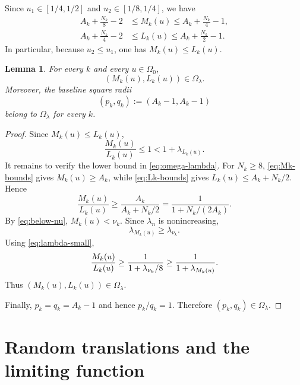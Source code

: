 \documentclass[11pt]{amsart}
\numberwithin{equation}{section}
\newtheorem{lemma}[theorem]{Lemma}
\begin{document}
Since $u_1\in[1/4,1/2]$ and $u_2\in[1/8,1/4]$, we have 
\begin{align}
A_k+\frac{N_k}{8}-2 &\le M_k(u)\le A_k+\frac{N_k}{4}-1,  \label{eq:Mk-bounds}
\\
A_k+\frac{N_k}{4}-2 &\le L_k(u)\le A_k+\frac{N_k}{2}-1.  \label{eq:Lk-bounds}
\end{align}
In particular, because $u_2\le u_1$, one has $M_k(u)\le L_k(u)$.

\begin{lemma}
\label{lem:inside-region} For every $k$ and every $u\in\Omega_0$, 
\begin{equation*}
(M_k(u),L_k(u))\in\Omega_\lambda.
\end{equation*}
Moreover, the baseline square radii 
\begin{equation}  \label{eq:baseline}
(p_k,q_k):=(A_k-1,A_k-1)
\end{equation}
belong to $\Omega_\lambda$ for every $k$.
\end{lemma}

\begin{proof}
Since $M_k(u)\le L_k(u)$, 
\begin{equation*}
\frac{M_k(u)}{L_k(u)}\le1<1+\lambda_{L_k(u)}.
\end{equation*}
It remains to verify the lower bound in \eqref{eq:omega-lambda}. For $%
N_k\ge8 $, \eqref{eq:Mk-bounds} gives $M_k(u)\ge A_k$, while %
\eqref{eq:Lk-bounds} gives $L_k(u)\le A_k+N_k/2$. Hence 
\begin{equation*}
\frac{M_k(u)}{L_k(u)} \ge \frac{A_k}{A_k+N_k/2} =\frac{1}{1+N_k/(2A_k)}.
\end{equation*}
By \eqref{eq:below-nu}, $M_k(u)<\nu_k$. Since $\lambda_n$ is nonincreasing, 
\begin{equation*}
\lambda_{M_k(u)}\ge \lambda_{\nu_k}.
\end{equation*}
Using \eqref{eq:lambda-small}, 
\begin{equation*}
\frac{M_k(u)}{L_k(u)} \ge \frac{1}{1+\lambda_{\nu_k}/8} \ge \frac{1}{%
1+\lambda_{M_k(u)}}.
\end{equation*}
Thus $(M_k(u),L_k(u))\in\Omega_\lambda$.

Finally, $p_k=q_k=A_k-1$ and hence $p_k/q_k=1$. Therefore $%
(p_k,q_k)\in\Omega_\lambda$.
\end{proof}

\section{Random translations and the limiting function}
\end{document}

